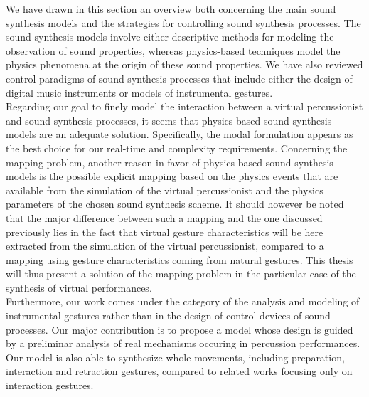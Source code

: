 {{We have drawn in this section an overview both concerning the main sound synthesis models and the strategies for controlling sound synthesis processes. The sound synthesis models involve either descriptive methods for modeling the observation of sound properties, whereas physics-based techniques model the physics phenomena at the origin of these sound properties. We have also reviewed control paradigms of sound synthesis processes that include either the design of digital music instruments or models of instrumental gestures.\\

Regarding our goal to finely model the interaction between a virtual percussionist and sound synthesis processes, it seems that physics-based sound synthesis models are an adequate solution. Specifically, the modal formulation appears as the best choice for our real-time and complexity requirements. Concerning the mapping problem, another reason in favor of physics-based sound synthesis models is the possible explicit mapping based on the physics events that are available from the simulation of the virtual percussionist and the physics parameters of the chosen sound synthesis scheme. It should however be noted that the major difference between such a mapping and the one discussed previously lies in the fact that virtual gesture characteristics will be here extracted from the simulation of the virtual percussionist, compared to a mapping using gesture characteristics coming from natural gestures. This thesis will thus present a solution of the mapping problem in the particular case of the synthesis of virtual performances.\\

Furthermore, our work comes under the category of the analysis and modeling of instrumental gestures rather than in the design of control devices of sound processes. Our major contribution is to propose a model whose design is guided by a preliminar analysis of real mechanisms occuring in percussion performances. Our model is also able to synthesize whole movements, including preparation, interaction and retraction gestures, compared to related works focusing only on interaction gestures.


\newpage\vfill


}}
